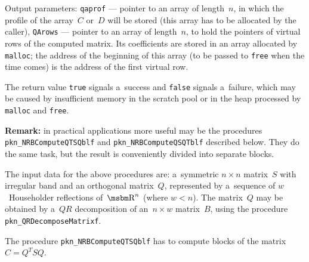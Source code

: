 Output parameters: \texttt{qaprof} --- pointer to an array of length~$n$,
in which the profile of the array~$C$ or~$D$ will be stored
(this array has to be allocated by the caller),
\texttt{QArows} --- pointer to an array  of length~$n$,
to hold the pointers of virtual rows of the computed matrix.
Its coefficients are stored in an array allocated by \texttt{malloc};
the address of the beginning of this array (to be passed to \texttt{free}
when the time comes) is the address of the first virtual row.

The return value \texttt{true} signals a~success and \texttt{false}
signals a~failure, which may be caused by insufficient memory in the
scratch pool or in the heap processed by
\texttt{malloc} and \texttt{free}.

\textbf{Remark:} in practical applications more useful may be the
procedures \\
\texttt{pkn\_NRBComputeQTSQblf} and \texttt{pkn\_NRBComputeQSQTblf}
described below. They do the same task, but the result is conveniently
divided into separate blocks.

\vspace{\bigskipamount}
The input data for the above procedures are:
a~symmetric $n\times n$ matrix~$S$ with irregular band and an
orthogonal matrix~$Q$, represented by a~sequence of $w$~Householder
reflections of~$\R^n$ (where $w<n$).
The matrix~$Q$ may be obtained by a~$QR$ decomposition of an~$n\times w$
matrix~$B$, using the procedure \texttt{pkn\_QRDecomposeMatrixf}.

The procedure \texttt{pkn\_NRBComputeQTSQblf} has to compute blocks of the matrix
$C=Q^TSQ$.

